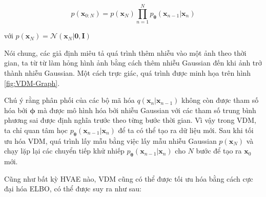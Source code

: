 \documentclass[14pt, a4paper]{article}
\numberwithin{equation}{section}
\numberwithin{figure}{section}
\numberwithin{dl}{section}
\numberwithin{md}{section}
\numberwithin{bd}{section}
\numberwithin{dn}{section}
\numberwithin{hq}{section}
\begin{document}
    \begin{equation}
        p(\boldsymbol{x}_{0:N}) = p(\boldsymbol{x}_N) \prod_{n=1}^N p_{\boldsymbol{\theta}} (\boldsymbol{x}_{n-1} \vert \boldsymbol{x}_n)
    \end{equation}

    với $p(\boldsymbol{x}_N) = \mathcal{N} (\boldsymbol{x}_N \vert \boldsymbol{0}, \boldsymbol{I})$

    Nói chung, các giả định miêu tả quá trình thêm nhiễu vào một ảnh theo thời gian, ta từ từ làm hỏng hình ảnh bằng cách thêm nhiễu Gaussian đến khi ảnh trở thành nhiễu Gaussian.
    Một cách trực giác, quá trình được minh họa trên hình \ref{fig:VDM-Graph}.

    Chú ý rằng phân phối của các bộ mã hóa $q(\boldsymbol{x}_n \vert \boldsymbol{x}_{n-1})$ không còn được tham số hóa bởi $\boldsymbol{\phi}$ mà được mô hình hóa bởi nhiễu Gaussian với các tham số trung bình phương sai được định nghĩa trước theo từng bước thời gian.
    Vì vậy trong VDM, ta chỉ quan tâm học $p_{\boldsymbol{\theta}} (\boldsymbol{x}_{n-1} \vert \boldsymbol{x}_n)$ để ta có thể tạo ra dữ liệu mới.
    Sau khi tối ưu hóa VDM, quá trình lấy mẫu bằng việc lấy mẫu nhiễu Gaussian $p(\boldsymbol{x}_N)$ và chạy lặp lại các chuyển tiếp khử nhiếp $p_{\boldsymbol{\theta}} (\boldsymbol{x}_{n-1} \vert \boldsymbol{x}_n)$ cho $N$ bước để tạo ra $\boldsymbol{x}_0$ mới.

    Cũng như bất kỳ HVAE nào, VDM cũng có thể được tối ưu hóa bằng cách cực đại hóa ELBO, có thể được suy ra như sau:
\end{document}
